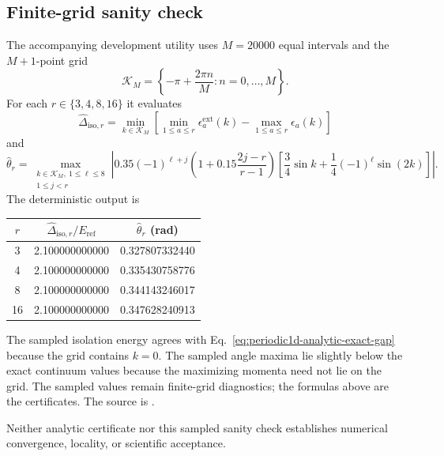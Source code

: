 \subsection{Finite-grid sanity check}
The accompanying development utility uses $M=20000$ equal intervals and the
$M+1$-point grid
\begin{equation}
 \mathcal K_M=\left\{-\pi+\frac{2\pi n}{M}:n=0,\ldots,M\right\}.
\end{equation}
For each $r\in\{3,4,8,16\}$ it evaluates
\begin{equation}
 \widehat\Delta_{\mathrm{iso},r}
 =\min_{k\in\mathcal K_M}
 \left[\min_{1\leq a\leq r}\epsilon_a^{\mathrm{ext}}(k)
 -\max_{1\leq a\leq r}\epsilon_a(k)\right]
 \label{eq:periodic1d-analytic-sampled-gap}
\end{equation}
and
\begin{equation}
 \widehat\theta_r
 =\max_{\substack{k\in\mathcal K_M,\ 1\leq\ell\leq8\\1\leq j<r}}
 \left|0.35(-1)^{\ell+j}
 \left(1+0.15\frac{2j-r}{r-1}\right)
 \left[\frac34\sin k+\frac14(-1)^\ell\sin(2k)\right]\right|.
 \label{eq:periodic1d-analytic-sampled-angle}
\end{equation}
The deterministic output is
\begin{center}\small
\begin{tabular}{ccc}
\toprule
$r$ & $\widehat\Delta_{\mathrm{iso},r}/E_{\mathrm{ref}}$ & $\widehat\theta_r$ (rad) \\
\midrule
3  & 2.100000000000 & 0.327807332440 \\
4  & 2.100000000000 & 0.335430758776 \\
8  & 2.100000000000 & 0.344143246017 \\
16 & 2.100000000000 & 0.347628240913 \\
\bottomrule
\end{tabular}
\end{center}
The sampled isolation energy agrees with Eq.~\eqref{eq:periodic1d-analytic-exact-gap} because the grid
contains $k=0$. The sampled angle maxima lie slightly below the exact continuum values
because the maximizing momenta need not lie on the grid. The sampled values remain
finite-grid diagnostics; the formulas above are the certificates. The source is
.

Neither analytic certificate nor this sampled sanity check establishes numerical
convergence, locality, or scientific acceptance.
